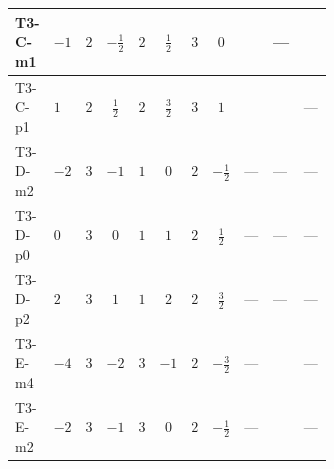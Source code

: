 \documentclass[8pt]{article}
\begin{document}
\begin{landscape}
\begin{longtable}{@{}llcccccc >{\raggedright\arraybackslash}p{0.21\linewidth} >{\raggedright\arraybackslash}p{0.21\linewidth} >{\raggedright\arraybackslash}p{0.21\linewidth}@{}}
\midrule
T3-C-m1 & $-1$ & $2$ & $-\frac{1}{2}$ & $2$ & $\frac{1}{2}$ & $3$ & $0$ & \scriptsize\adjustbox{max width=\linewidth}{$\begin{gathered} +\frac{3}{2} T_{\nu}^{(2)} \left({y_2}\right)_{ij}\end{gathered}$} & --- & \scriptsize\adjustbox{max width=\linewidth}{$\begin{gathered} \frac{3}{2} \operatorname{Tr}\!\left({y_2}\,\left({y_1}\right)^{\dagger}\right) \left({y_1}\right)_{ij}\end{gathered}$} \\
\midrule
T3-C-p1 & $1$ & $2$ & $\frac{1}{2}$ & $2$ & $\frac{3}{2}$ & $3$ & $1$ & \scriptsize\adjustbox{max width=\linewidth}{$\begin{gathered} \frac{3}{2} T_{\nu}^{(2)} \left({y_2}\right)_{ij}\end{gathered}$} & \scriptsize\adjustbox{max width=\linewidth}{$\begin{gathered} +\frac{1}{4} (3 \left({y_1}\,\left({y_1}\right)^{\dagger}\,{y_2}\right)_{ij}+2 \left({Y_e}\,\left({Y_e}\right)^{\dagger}\,{y_2}\right)_{ij}+5 \left({y_2}\,\left({y_2}\right)^{\dagger}\,{y_2}\right)_{ij})\end{gathered}$} & --- \\
\midrule
T3-D-m2 & $-2$ & $3$ & $-1$ & $1$ & $0$ & $2$ & $-\frac{1}{2}$ & --- & --- & --- \\
\midrule
T3-D-p0 & $0$ & $3$ & $0$ & $1$ & $1$ & $2$ & $\frac{1}{2}$ & --- & --- & --- \\
\midrule
T3-D-p2 & $2$ & $3$ & $1$ & $1$ & $2$ & $2$ & $\frac{3}{2}$ & --- & --- & --- \\
\midrule
T3-E-m4 & $-4$ & $3$ & $-2$ & $3$ & $-1$ & $2$ & $-\frac{3}{2}$ & --- & \scriptsize\adjustbox{max width=\linewidth}{$\begin{gathered} +\frac{1}{4} (3 \left({y_1}\,\left({y_1}\right)^{\dagger}\,{y_2}\right)_{ij}+2 \left({Y_e}\,\left({Y_e}\right)^{\dagger}\,{y_2}\right)_{ij}+6 \left({y_2}\,\left({y_2}\right)^{\dagger}\,{y_2}\right)_{ij})\end{gathered}$} & --- \\
\midrule
T3-E-m2 & $-2$ & $3$ & $-1$ & $3$ & $0$ & $2$ & $-\frac{1}{2}$ & --- & \scriptsize\adjustbox{max width=\linewidth}{$\begin{gathered} +\frac{1}{4} (3 \left({y_1}\,\left({y_1}\right)^{\dagger}\,{y_2}\right)_{ij}+2 \left({Y_e}\,\left({Y_e}\right)^{\dagger}\,{y_2}\right)_{ij}+6 \left({y_2}\,\left({y_2}\right)^{\dagger}\,{y_2}\right)_{ij})\end{gathered}$} & --- \\

\end{longtable}
\end{landscape}
\end{document}
